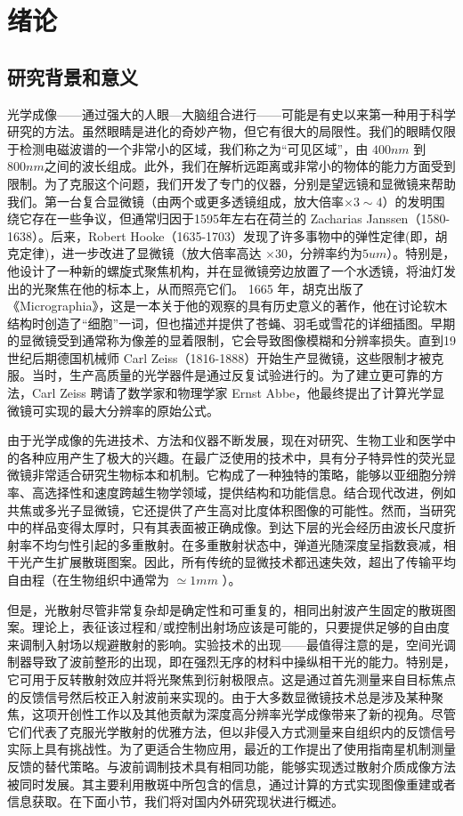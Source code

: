 
\chapter{绪论}\label{chap:1}
\section{研究背景和意义}
光学成像——通过强大的人眼—大脑组合进行——可能是有史以来第一种用于科学研究的方法。虽然眼睛是进化的奇妙产物，但它有很大的局限性。我们的眼睛仅限于检测电磁波谱的一个非常小的区域，我们称之为“可见区域”，由 $400 nm$ 到 $800 nm$之间的波长组成。此外，我们在解析远距离或非常小的物体的能力方面受到限制。为了克服这个问题，我们开发了专门的仪器，分别是望远镜和显微镜来帮助我们。第一台复合显微镜（由两个或更多透镜组成，放大倍率$ \times 3 \sim 4$）的发明围绕它存在一些争议，但通常归因于1595年左右在荷兰的 Zacharias Janssen（1580-1638）。后来，Robert Hooke（1635-1703）发现了许多事物中的弹性定律(即，胡克定律)，进一步改进了显微镜（放大倍率高达 $ \times 30$，分辨率约为$5 um$）。特别是，他设计了一种新的螺旋式聚焦机构，并在显微镜旁边放置了一个水透镜，将油灯发出的光聚焦在他的标本上，从而照亮它们。 1665 年，胡克出版了《Micrographia》\cite{robert_micrographia_2015}，这是一本关于他的观察的具有历史意义的著作，他在讨论软木结构时创造了“细胞”一词，但也描述并提供了苍蝇、羽毛或雪花的详细插图。早期的显微镜受到通常称为像差的显着限制，它会导致图像模糊和分辨率损失。直到19世纪后期德国机械师 Carl Zeiss（1816-1888）开始生产显微镜，这些限制才被克服。当时，生产高质量的光学器件是通过反复试验进行的。为了建立更可靠的方法，Carl Zeiss 聘请了数学家和物理学家 Ernst Abbe，他最终提出了计算光学显微镜可实现的最大分辨率的原始公式\cite{abbe_beitrage_1873}。

由于光学成像的先进技术、方法和仪器不断发展，现在对研究、生物工业和医学中的各种应用产生了极大的兴趣。在最广泛使用的技术中，具有分子特异性的荧光显微镜非常适合研究生物标本和机制。它构成了一种独特的策略，能够以亚细胞分辨率、高选择性和速度跨越生物学领域，提供结构和功能信息\cite{Lich传输矩阵an2005}。结合现代改进，例如共焦或多光子显微镜，它还提供了产生高对比度体积图像的可能性。然而，当研究中的样品变得太厚时，只有其表面被正确成像。到达下层的光会经历由波长尺度折射率不均匀性引起的多重散射。在多重散射状态中，弹道光随深度呈指数衰减，相干光产生扩展散斑图案\cite{Goodman1976}。因此，所有传统的显微技术都迅速失效，超出了传输平均自由程（在生物组织中通常为 $\simeq 1 mm$ \cite{ntziachristos_going_2010}）。

但是，光散射尽管非常复杂却是确定性和可重复的，相同出射波产生固定的散斑图案。理论上，表征该过程和/或控制出射场应该是可能的，只要提供足够的自由度来调制入射场以规避散射的影响。实验技术的出现——最值得注意的是，空间光调制器导致了波前整形的出现，即在强烈无序的材料中操纵相干光的能力。特别是，它可用于反转散射效应并将光聚焦到衍射极限点\cite{Vellekoop2007}。这是通过首先测量来自目标焦点的反馈信号然后校正入射波前来实现的。由于大多数显微镜技术总是涉及某种聚焦，这项开创性工作以及其他贡献为深度高分辨率光学成像带来了新的视角。尽管它们代表了克服光学散射的优雅方法，但以非侵入方式测量来自组织内的反馈信号实际上具有挑战性。为了更适合生物应用，最近的工作提出了使用指南星机制测量反馈的替代策略。与波前调制技术具有相同功能，能够实现透过散射介质成像方法被同时发展。其主要利用散斑中所包含的信息，通过计算的方式实现图像重建或者信息获取。在下面小节，我们将对国内外研究现状进行概述。

